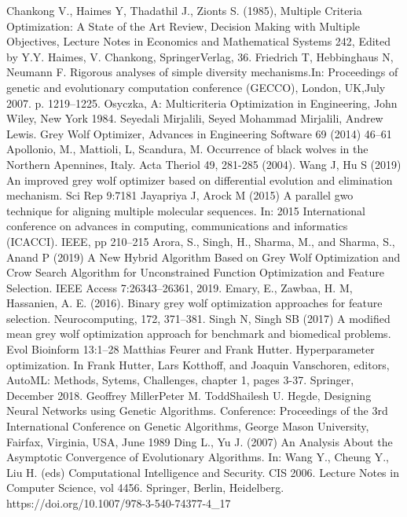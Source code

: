 \documentclass[conference]{IEEEtran}
\theoremstyle{definition}
\begin{document}
% 
\begin{thebibliography}{00}
 Chankong V., Haimes Y, Thadathil J., Zionts S. (1985), Multiple Criteria Optimization: A State of the Art Review, Decision Making with Multiple Objectives, Lecture Notes in Economics and Mathematical Systems 242, Edited by Y.Y. Haimes, V. Chankong, SpringerVerlag, 36.
Friedrich T, Hebbinghaus N, Neumann F. Rigorous analyses of simple diversity mechanisms.In: Proceedings of genetic and evolutionary computation conference (GECCO), London, UK,July 2007. p. 1219–1225.
Osyczka, A: Multicriteria Optimization in Engineering, John Wiley, New York 1984.
Seyedali Mirjalili, Seyed Mohammad Mirjalili, Andrew Lewis. Grey Wolf Optimizer, Advances in Engineering Software 69 (2014) 46–61
 Apollonio, M., Mattioli, L, Scandura, M. Occurrence of black wolves in the Northern Apennines, Italy. Acta Theriol 49, 281-285 (2004).
Wang J, Hu S (2019) An improved grey wolf optimizer based on differential evolution and elimination mechanism. Sci Rep 9:7181
Jayapriya J, Arock M (2015) A parallel gwo technique for aligning multiple molecular sequences. In: 2015 International conference on advances in computing, communications and informatics (ICACCI). IEEE, pp 210–215
Arora, S., Singh, H., Sharma, M., and Sharma, S., Anand P (2019) A New Hybrid Algorithm Based on Grey Wolf Optimization and Crow Search Algorithm for Unconstrained Function Optimization and Feature Selection. IEEE Access 7:26343–26361, 2019.
Emary, E., Zawbaa, H. M, Hassanien, A. E. (2016). Binary grey wolf optimization approaches for feature selection. Neurocomputing, 172, 371–381.
Singh N, Singh SB (2017) A modified mean grey wolf optimization approach for benchmark and biomedical problems. Evol Bioinform 13:1–28
Matthias Feurer and Frank Hutter. Hyperparameter optimization. In Frank Hutter, Lars Kotthoff, and Joaquin Vanschoren, editors, AutoML: Methods, Sytems, Challenges, chapter 1, pages 3-37. Springer, December 2018.
 Geoffrey MillerPeter M. ToddShailesh U. Hegde, Designing Neural Networks using Genetic Algorithms. Conference: Proceedings of the 3rd International Conference on Genetic Algorithms, George Mason University, Fairfax, Virginia, USA, June 1989
Ding L., Yu J. (2007) An Analysis About the Asymptotic Convergence of Evolutionary Algorithms. In: Wang Y., Cheung Y., Liu H. (eds) Computational Intelligence and Security. CIS 2006. Lecture Notes in Computer Science, vol 4456. Springer, Berlin, Heidelberg. https://doi.org/10.1007/978-3-540-74377-4_17

\end{thebibliography}
\end{document}
